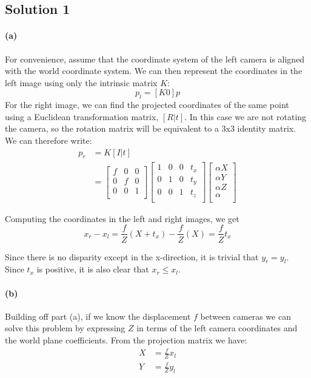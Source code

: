 \documentclass{article}
\newcommand{\solution}[1]{\clearpage \subsection*{Solution #1}}
\newcommand{\spart}[1]{\paragraph{(#1)}}
\begin{document}

\solution{1}

\spart{a} For convenience, assume that the coordinate system of the left camera is aligned with the world coordinate system. We can then represent the coordinates in the left image using only the intrinsic matrix $K$:
\begin{equation}
p_l = [K 0]p
\end{equation}
For the right image, we can find the projected coordinates of the same point using a Euclidean transformation matrix, $[R | t]$. In this case we are not rotating the camera, so the rotation matrix will be equivalent to a 3x3 identity matrix. We can therefore write:
\begin{align}
p_r &= K[I | t] \\
&=
\begin{bmatrix}
f & 0 & 0 \\
0 & f & 0 \\
0 & 0 & 1 \\
\end{bmatrix}
\begin{bmatrix}
1 & 0 & 0 & t_x \\
0 & 1 & 0 & t_y \\
0 & 0 & 1 & t_z \\
\end{bmatrix}
\begin{bmatrix}
\alpha X \\
\alpha Y \\
\alpha Z \\
\alpha \\
\end{bmatrix}
\end{align}

Computing the coordinates in the left and right images, we get
\begin{equation}
x_r - x_l = \frac{f}{Z}(X+t_x) - \frac{f}{Z}(X) = \frac{f}{Z}t_x
\end{equation}

Since there is no disparity except in the x-direction, it is trivial that $y_r = y_l$. Since $t_x$ is positive, it is also clear that $x_r \leq x_l$.

\spart{b} Building off part (a), if we know the displacement $f$ between cameras we can solve this problem by expressing $Z$ in terms of the left camera coordinates and the world plane coefficients. From the projection matrix we have:
\begin{align}
X &= \frac{f}{Z}x_l \\
Y &= \frac{f}{Z}y_l \\
\end{align}
\end{document}
